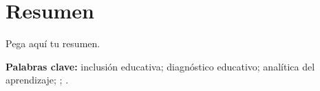 \chapter*{Resumen}

Pega aquí tu resumen.

\noindent\textbf{Palabras clave:} inclusión educativa; diagnóstico educativo; analítica del aprendizaje; \IA; \DUA.
\clearpage